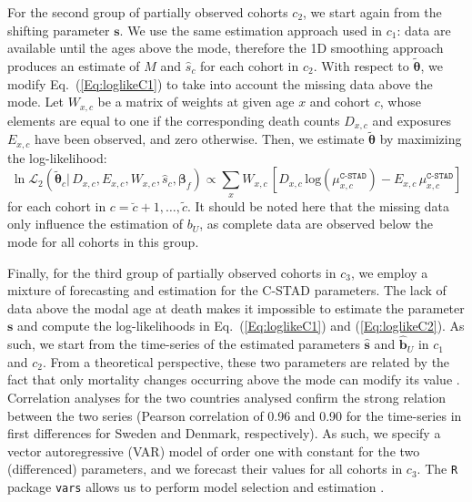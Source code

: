 \documentclass[11pt, a4paper]{article}
\begin{document}
For the second group of partially observed cohorts $c_2$, we start again from the shifting parameter $\bm{s}$. We use the same estimation approach used in $c_1$: data are available until the ages above the mode, therefore the 1D smoothing approach produces an estimate of $M$ and $\hat{s}_c$ for each cohort in $c_2$. With respect to $\tilde{\bm{\theta}}$, we modify Eq.~(\ref{Eq:loglikeC1}) to take into account the missing data above the mode. Let $W_{x,c}$ be a matrix of weights at given age $x$ and cohort $c$, whose elements are equal to one if the corresponding death counts $D_{x,c}$ and exposures $E_{x,c}$ have been observed, and zero otherwise. Then, we estimate $\tilde{\bm{\theta}}$ by maximizing the log-likelihood:
%
\begin{equation}\label{Eq:loglikeC2}
\ln\mathcal{L}_2\left(\tilde{\bm{\theta}}_c | \, D_{x,c} , E_{x,c} , W_{x,c} , \hat{s}_{c}, \bm{\beta}_{f}
\right) \propto \sum_{x} W_{x,c} \, \left[  D_{x,c} \,
\mathrm{log} \left( \mu^{\texttt{C-STAD}}_{x,c}  \right) - E_{x,c}
\, \mu^{\texttt{C-STAD}}_{x,c} \right] 
\end{equation}
%
for each cohort in $c=\breve{c}+1,\ldots,\tilde{c}$. It should be noted here that the missing data only influence the estimation of $b_U$, as complete data are observed below the mode for all cohorts in this group. 

Finally, for the third group of partially observed cohorts in $c_3$, we employ a mixture of forecasting and estimation for the C-STAD parameters. The lack of data above the modal age at death makes it impossible to estimate the parameter $\bm{s}$ and compute the log-likelihoods in Eq.~(\ref{Eq:loglikeC1}) and (\ref{Eq:loglikeC2}). As such, we start from the time-series of the estimated parameters $\hat{\bm{s}}$ and $\hat{\bm{b}}_U$ in $c_1$ and $c_2$. From a theoretical perspective, these two parameters are related by the fact that only mortality changes occurring above the mode can modify its value \cite[cf.~Appendix B in][]{canudas2010three}. Correlation analyses for the two countries analysed confirm the strong relation between the two series (Pearson correlation of 0.96 and 0.90 for the time-series in first differences for Sweden and Denmark, respectively). As such, we specify a vector autoregressive (VAR) model of order one with constant for the two (differenced) parameters, and we forecast their values for all cohorts in $c_3$. The \texttt{R} package \texttt{vars} allows us to perform model selection and estimation \citep{pfaff2008analysis,pfaff2008var}.
\end{document}
